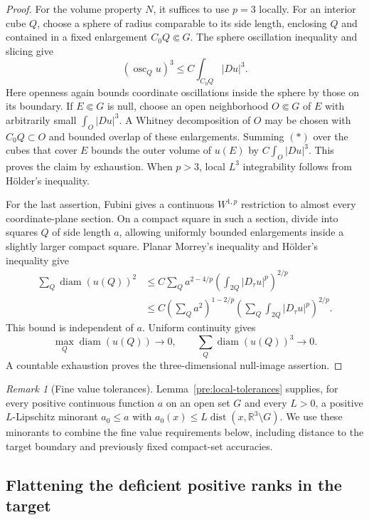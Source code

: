 \documentclass[11pt]{article}
\numberwithin{equation}{section}
\theoremstyle{definition}
\theoremstyle{remark}
\newtheorem{remark}[theorem]{Remark}
\newcommand{\R}{\mathbb R}
\DeclareMathOperator{\diam}{diam}
\DeclareMathOperator{\dist}{dist}
\begin{document}
\begin{proof}
For the volume property $N$, it suffices to use $p=3$ locally.
For an interior cube $Q$, choose a sphere of radius comparable to
its side length, enclosing $Q$ and contained in a fixed enlargement
$C_0Q\Subset G$.  The sphere oscillation inequality and slicing give
\[
 (\operatorname{osc}_Q u)^3
 \le C\int_{C_0Q}|Du|^3.                 \tag{$*$}
\]
Here openness again bounds coordinate oscillations inside the sphere
by those on its boundary.  If $E\Subset G$ is null, choose an open
neighborhood $O\Subset G$ of $E$ with arbitrarily small
$\int_O|Du|^3$.  A Whitney decomposition of $O$ may be chosen with
$C_0Q\subset O$ and bounded overlap of these enlargements.  Summing
$(*)$ over the cubes that cover $E$ bounds the outer volume of $u(E)$
by $C\int_O|Du|^3$.  This proves the claim by exhaustion.  When
$p>3$, local $L^3$ integrability follows from H\"older's inequality.

For the last assertion, Fubini gives a continuous $W^{1,p}$
restriction to almost every coordinate-plane section.  On a compact
square in such a section, divide into squares $Q$ of side length
$a$, allowing uniformly bounded enlargements inside a slightly larger
compact square.  Planar Morrey's inequality and H\"older's inequality
give
\[
 \begin{split}
 \sum_Q\diam(u(Q))^2
 &\le C\sum_Q
 a^{2-4/p}\left(\int_{2Q}|D_\tau u|^p\right)^{2/p}\\
 &\le C\left(\sum_Q a^2\right)^{1-2/p}
       \left(\sum_Q\int_{2Q}|D_\tau u|^p\right)^{2/p}.
 \end{split}
\]
This bound is independent of $a$.  Uniform continuity gives
\[
 \max_Q\diam(u(Q))\longrightarrow0,
 \qquad \sum_Q\diam(u(Q))^3\longrightarrow0.
\]
A countable exhaustion proves the three-dimensional null-image
assertion.
\end{proof}

\begin{remark}[Fine value tolerances]\label{hp:fine-tolerance}
Lemma~\ref{pre:local-tolerances} supplies, for every positive continuous
function $a$ on an open set $G$ and every $L>0$, a positive
$L$-Lipschitz minorant $a_0\le a$ with
$a_0(x)\le L\dist(x,\R^3\setminus G)$.  We use these minorants to
combine the fine value requirements below, including distance to the
target boundary and previously fixed compact-set accuracies.
\end{remark}


\subsection{Flattening the deficient positive ranks in the target}
\end{document}
